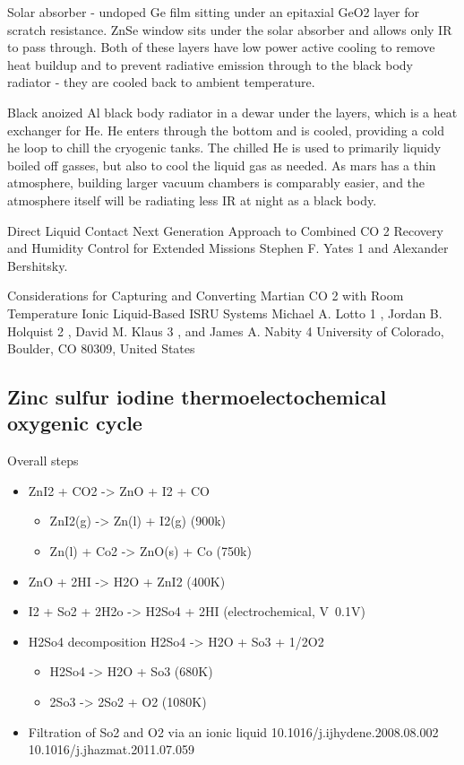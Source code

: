 \documentclass[10pt]{article}
\begin{document}
Solar absorber - undoped Ge film sitting under an epitaxial GeO2 layer for scratch resistance.
ZnSe window sits under the solar absorber and allows only IR to pass through.
Both of these layers have low power active cooling to remove heat buildup and to prevent radiative emission through to the black body radiator - they are cooled back to ambient temperature.

Black anoized Al black body radiator in a dewar under the layers, which is a heat exchanger for He. He enters through the bottom and is cooled, providing a cold he loop to chill the cryogenic tanks. The chilled He is used to primarily liquidy boiled off gasses, but also to cool the liquid gas as needed. As mars has a thin atmosphere, building larger vacuum chambers is comparably easier, and the atmosphere itself will be radiating less IR at night as a black body.


Direct Liquid Contact  Next Generation Approach to
Combined CO 2 Recovery and Humidity Control for
Extended Missions
Stephen F. Yates 1 and Alexander Bershitsky.

Considerations for Capturing and Converting Martian CO 2
with Room Temperature Ionic Liquid-Based ISRU Systems
Michael A. Lotto 1 , Jordan B. Holquist 2 , David M. Klaus 3 , and James A. Nabity 4
University of Colorado, Boulder, CO 80309, United States


\subsection*{Zinc sulfur iodine thermoelectochemical oxygenic cycle}

Overall steps
\begin{itemize}
    \item ZnI2 + CO2 -> ZnO + I2 + CO
    \begin{itemize}
        \item ZnI2(g) -> Zn(l) + I2(g) (900k)
        \item Zn(l) + Co2 -> ZnO(s) + Co (750k)
    \end{itemize}
    \item ZnO + 2HI -> H2O + ZnI2 (400K)
    \item I2 + So2 + 2H2o -> H2So4 + 2HI (electrochemical, V~0.1V)
    \item H2So4 decomposition H2So4 -> H2O + So3 + 1/2O2
    \begin{itemize}
        \item H2So4 -> H2O + So3 (680K)
        \item 2So3 -> 2So2 + O2 (1080K)
    \end{itemize}
    \item Filtration of So2 and O2 via an ionic liquid 10.1016/j.ijhydene.2008.08.002 10.1016/j.jhazmat.2011.07.059
\end{itemize}
\end{document}
